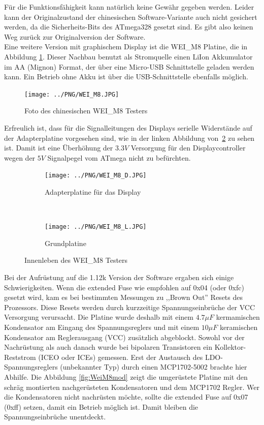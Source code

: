 Für die Funktionsfähigkeit kann natürlich keine Gewähr gegeben werden.
Leider kann der Originalzustand der chinesischen Software-Variante auch nicht gesichert werden,
da die Sicherheits-Bits des ATmega328 gesetzt sind.
Es gibt also keinen Weg zurück zur Originalversion der Software.\\ 

Eine weitere Version mit graphischem Display ist die WEI\_M8 Platine, die in Abbildung \ref{fig:WeiM8}.
Dieser Nachbau benutzt als Stromquelle einen LiIon Akkumulator im AA (Mignon) Format, der über
eine Micro-USB Schnittstelle geladen werden kann. Ein Betrieb ohne Akku ist über die USB-Schnittstelle
ebenfalls möglich.

\begin{figure}[H]
\centering
\texttt{[image: ../PNG/WEI\_M8.JPG]}
\caption{Foto des chinesischen WEI\_M8 Testers}
\label{fig:WeiM8}
\end{figure}

Erfreulich ist, dass für die Signalleitungen des Displays serielle Widerstände
auf der Adapterplatine vorgesehen sind, wie in der linken Abbildung von~\ref{fig:WeiM8int}
zu sehen ist. Damit ist eine Überhöhung der \(3.3V\) Versorgung für den Displaycontroller
wegen der \(5V\) Signalpegel vom ATmega nicht zu befürchten.

\begin{figure}[H]
  \begin{subfigure}[b]{9cm}
    \centering
    \texttt{[image: ../PNG/WEI\_M8\_D.JPG]}
    \caption{Adapterplatine für das Display}
  \end{subfigure}
  ~
  \begin{subfigure}[b]{9cm}
    \centering
    \texttt{[image: ../PNG/WEI\_M8\_L.JPG]}
    \caption{Grundplatine}
  \end{subfigure}
  \caption{Innenleben des WEI\_M8 Testers}
  \label{fig:WeiM8int}
\end{figure}


Bei der Aufrüstung auf die 1.12k Version
der Software ergaben sich einige Schwierigkeiten. Wenn die extended Fuse wie empfohlen auf
0x04 (oder 0xfc) gesetzt wird, kam es bei bestimmten Messungen zu ,,Brown Out'' Resets des
Prozessors. Diese Resets werden durch kurzzeitige Spannungseinbrüche der VCC Versorgung
verursacht. Die Platine wurde deshalb mit einem \(4.7\mu F\) kermamischen Kondensator
am Eingang des Spannungsreglers und mit einem \(10\mu F\) keramischen Kondensator am
Reglerausgang (VCC) zusätzlich abgeblockt. Sowohl vor der Nachrüstung als auch danach
wurde bei bipolaren Transistoren ein Kollektor-Reststrom (ICEO oder ICEs) gemessen.
Erst der Austausch des LDO-Spannungsreglers (unbekannter Typ) durch einen MCP1702-5002
brachte hier Abhilfe. Die Abbildung \ref{fig:WeiM8mod} zeigt die umgerüstete Platine
mit den schräg montierten nachgerüsteten Kondensatoren und dem MCP1702 Regler.
Wer die Kondensatoren nicht nachrüsten möchte, sollte die extended Fuse auf 0x07 (0xff)
setzen, damit ein Betrieb möglich ist. Damit bleiben die Spannungseinbrüche unentdeckt.

